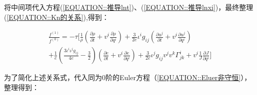 \documentclass[LBMDerivation.tex]{subfiles}
\begin{document}
将中间项代入方程(\ref{EQUATION::推导lnt})、(\ref{EQUATION::推导lnxi})，最终整理(\ref{EQUATION::Kn的关系}),得到：






\begin{equation}
  \begin{gathered}
    \frac{f^{(1)}}{f^{(0)}}=
    -\tau [\frac{1}{\rho}(\frac{\partial \rho}{\partial t} + v^{i}\frac{\partial \rho}{\partial q^i}) + \frac{3}{2e}\iota^i g_{ij} (\frac{\partial u^j}{\partial t}+ v^i \frac{\partial u^j}{\partial q^i}) \\
      + \frac{1}{e} (\frac{3 {\iota^i\iota^jg_{ij}}}{4e}-\frac{3}{2}) (\frac{\partial e}{\partial t} + v^i \frac{\partial e}{\partial q^i}) + \frac{3}{2e}\iota^j g_{ij} v^{j} v^{k} \Gamma_{j k}^{i}   + v^i  \frac{1}{J}\frac{\partial J}{\partial q^i} ]
  \end{gathered}
\end{equation}




为了简化上述关系式，代入同为0阶的Euler方程（\ref{EQUATION::Eluer非守恒}），整理得到：
\end{document}
